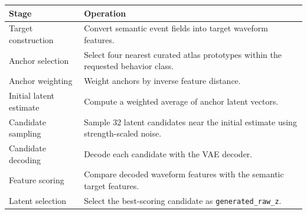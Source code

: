 \begin{appendixtable}
\centering
\caption{Latent search stages.}
\label{tab:latent-search}
\begin{singlespace}
\renewcommand{\arraystretch}{1.1}
\begin{tabular}{@{}>{\raggedright\arraybackslash}p{1.65in}>{\raggedright\arraybackslash}p{4.15in}@{}}
\hline
\textbf{Stage} & \textbf{Operation} \\
\hline
Target construction & Convert semantic event fields into target waveform features. \\
Anchor selection & Select four nearest curated atlas prototypes within the requested behavior class. \\
Anchor weighting & Weight anchors by inverse feature distance. \\
Initial latent estimate & Compute a weighted average of anchor latent vectors. \\
Candidate sampling & Sample 32 latent candidates near the initial estimate using strength-scaled noise. \\
Candidate decoding & Decode each candidate with the VAE decoder. \\
Feature scoring & Compare decoded waveform features with the semantic target features. \\
Latent selection & Select the best-scoring candidate as \texttt{generated\_raw\_z}. \\
\hline
\end{tabular}
\end{singlespace}
\end{appendixtable}
